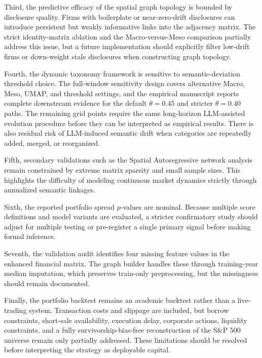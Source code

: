 \documentclass[11pt, a4paper]{article}
\begin{document}
Third, the predictive efficacy of the spatial graph topology is bounded by disclosure quality. Firms with boilerplate or near-zero-drift disclosures can introduce persistent but weakly informative links into the adjacency matrix. The strict identity-matrix ablation and the Macro-versus-Meso comparison partially address this issue, but a future implementation should explicitly filter low-drift firms or down-weight stale disclosures when constructing graph topology.

Fourth, the dynamic taxonomy framework is sensitive to semantic-deviation threshold choice. The full-window sensitivity design covers alternative Macro, Meso, UMAP, and threshold settings, and the empirical manuscript reports complete downstream evidence for the default $\theta=0.45$ and stricter $\theta=0.40$ paths. The remaining grid points require the same long-horizon LLM-assisted evolution procedure before they can be interpreted as empirical results. There is also residual risk of LLM-induced semantic drift when categories are repeatedly added, merged, or reorganized.

Fifth, secondary validations such as the Spatial Autoregressive network analysis remain constrained by extreme matrix sparsity and small sample sizes. This highlights the difficulty of modeling continuous market dynamics strictly through annualized semantic linkages.

Sixth, the reported portfolio spread $p$-values are nominal. Because multiple score definitions and model variants are evaluated, a stricter confirmatory study should adjust for multiple testing or pre-register a single primary signal before making formal inference.

Seventh, the validation audit identifies four missing feature values in the enhanced financial matrix. The graph builder handles these through training-year median imputation, which preserves train-only preprocessing, but the missingness should remain documented.

Finally, the portfolio backtest remains an academic backtest rather than a live-trading system. Transaction costs and slippage are included, but borrow constraints, short-sale availability, execution delay, corporate actions, liquidity constraints, and a fully survivorship-bias-free reconstruction of the S\&P 500 universe remain only partially addressed. These limitations should be resolved before interpreting the strategy as deployable capital.
\end{document}
